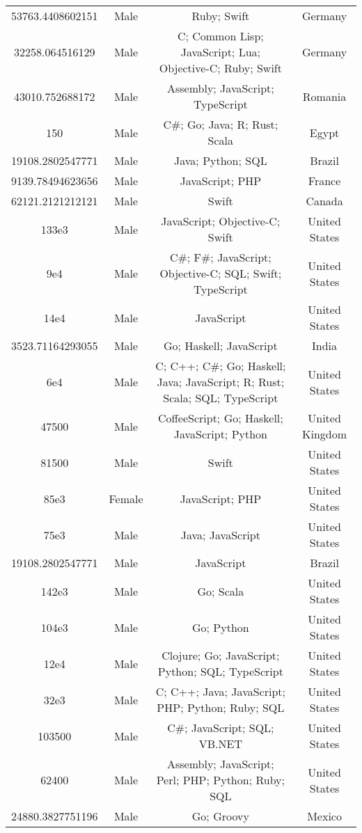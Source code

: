 \begin{center}
\begin{tabular}{ |c|c|c|c| }
53763.4408602151  &  Male  &  Ruby; Swift  &  Germany  \\ 
32258.064516129  &  Male  &  C; Common Lisp; JavaScript; Lua; Objective-C; Ruby; Swift  &  Germany  \\ 
43010.752688172  &  Male  &  Assembly; JavaScript; TypeScript  &  Romania  \\ 
150  &  Male  &  C\#; Go; Java; R; Rust; Scala  &  Egypt  \\ 
19108.2802547771  &  Male  &  Java; Python; SQL  &  Brazil  \\ 
9139.78494623656  &  Male  &  JavaScript; PHP  &  France  \\ 
62121.2121212121  &  Male  &  Swift  &  Canada  \\ 
133e3  &  Male  &  JavaScript; Objective-C; Swift  &  United States  \\ 
9e4  &  Male  &  C\#; F\#; JavaScript; Objective-C; SQL; Swift; TypeScript  &  United States  \\ 
14e4  &  Male  &  JavaScript  &  United States  \\ 
3523.71164293055  &  Male  &  Go; Haskell; JavaScript  &  India  \\ 
6e4  &  Male  &  C; C++; C\#; Go; Haskell; Java; JavaScript; R; Rust; Scala; SQL; TypeScript  &  United States  \\ 
47500  &  Male  &  CoffeeScript; Go; Haskell; JavaScript; Python  &  United Kingdom  \\ 
81500  &  Male  &  Swift  &  United States  \\ 
85e3  &  Female  &  JavaScript; PHP  &  United States  \\ 
75e3  &  Male  &  Java; JavaScript  &  United States  \\ 
19108.2802547771  &  Male  &  JavaScript  &  Brazil  \\ 
142e3  &  Male  &  Go; Scala  &  United States  \\ 
104e3  &  Male  &  Go; Python  &  United States  \\ 
12e4  &  Male  &  Clojure; Go; JavaScript; Python; SQL; TypeScript  &  United States  \\ 
32e3  &  Male  &  C; C++; Java; JavaScript; PHP; Python; Ruby; SQL  &  United States  \\ 
103500  &  Male  &  C\#; JavaScript; SQL; VB.NET  &  United States  \\ 
62400  &  Male  &  Assembly; JavaScript; Perl; PHP; Python; Ruby; SQL  &  United States  \\ 
24880.3827751196  &  Male  &  Go; Groovy  &  Mexico  \\ 

\end{tabular}
\end{center}
